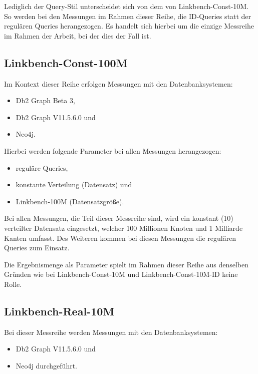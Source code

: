 Lediglich der Query-Stil unterscheidet sich von dem von  Linkbench-Const-10M. So werden bei den Messungen im Rahmen dieser Reihe, die ID-Queries statt der regulären Queries herangezogen. Es handelt sich hierbei um die einzige Messreihe im Rahmen der Arbeit, bei der dies der Fall ist.

\subsection{Linkbench-Const-100M}
Im Kontext dieser Reihe erfolgen Messungen mit den Datenbanksystemen:
\begin{itemize}
    \item Db2 Graph Beta 3,
    \item Db2 Graph V11.5.6.0 und 
    \item Neo4j. 
\end{itemize}

Hierbei werden folgende Parameter bei allen Messungen herangezogen:
\begin{itemize}
    \item reguläre Queries,
    \item konstante Verteilung (Datensatz) und
    \item Linkbench-100M (Datensatzgröße).
\end{itemize}
Bei allen Messungen, die Teil dieser Messreihe sind, wird ein konstant (10) verteilter Datensatz eingesetzt, welcher 100 Millionen Knoten und 1 Milliarde Kanten umfasst. Des Weiteren kommen bei diesen Messungen die regulären Queries zum Einsatz. 

Die Ergebnismenge als Parameter spielt im Rahmen dieser Reihe aus denselben Gründen wie bei Linkbench-Const-10M und Linkbench-Const-10M-ID keine Rolle.

\subsection{Linkbench-Real-10M}
Bei dieser Messreihe werden Messungen mit den Datenbanksystemen:
\begin{itemize}
    \item Db2 Graph V11.5.6.0 und 
    \item Neo4j durchgeführt. 
\end{itemize}


